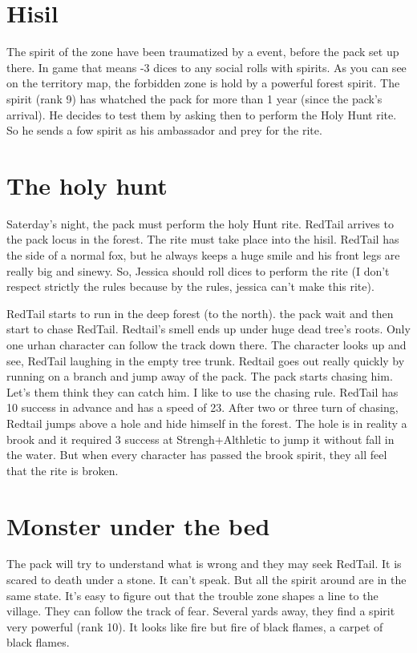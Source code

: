 \documentclass[oneside,12pt]{book}
\begin{document}
\begin{flushleft}
\section{Hisil}
The spirit of the zone have been traumatized by a event, before the pack set up there. In game that means -3 dices to any social rolls with spirits.
As you can see on the territory map, the forbidden zone is hold by a powerful forest spirit. The spirit (rank 9) has whatched the pack for more than 1 year (since the pack's arrival). He decides to test them by asking then to perform the Holy Hunt rite. So he sends a fow spirit as his ambassador and prey for the rite. 


\section{The holy hunt}
Saterday's night, the pack must perform the holy Hunt rite. RedTail arrives to the pack locus in the forest. The rite must take place into the hisil. 
RedTail has the side of a normal fox, but he always keeps a huge smile and his front legs are really big and sinewy. 
So, Jessica should roll dices to perform the rite (I don't respect strictly the rules because by the rules, jessica can't make this rite).

RedTail starts to run in the deep forest (to the north). the pack wait and then start to chase RedTail. Redtail's smell ends up under huge dead tree's roots. Only one urhan character can follow the track down there. The character looks up and see, RedTail laughing in the empty tree trunk.  Redtail goes out really quickly by running on a branch and jump away of the pack. The pack starts chasing him. Let's them think they can catch him. I like to use the chasing rule. RedTail has 10 success in advance and has a speed of 23. After two or three turn of chasing, Redtail jumps above a hole and hide himself in the forest. The hole is in reality a brook and it required 3 success at Strengh+Althletic to jump it without fall in the water. 
But when every character has passed the brook spirit, they all feel that the rite is broken.  


\section{Monster under the bed}
The pack will try to understand what is wrong and they may seek RedTail. It is scared to death under a stone. It can't speak. But all the spirit around are in the same state. It's easy to figure out that the trouble zone shapes a line to the village. They can follow the track of fear. Several yards away, they find a spirit very powerful (rank 10). It looks like fire but fire of black flames, a carpet of black flames. \\


\end{flushleft}
\end{document}
